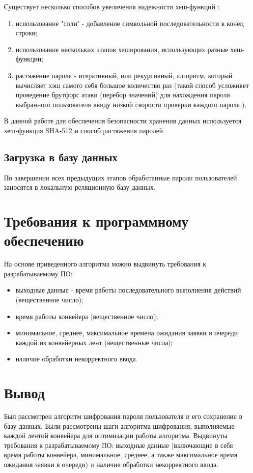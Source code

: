 \documentclass[a4paper,oneside,14pt]{extreport}
\begin{document}
Существует несколько способов увеличения надежности хеш-функций \cite{security}:
\begin{enumerate}
	\item использование "соли" - добавление символьной последовательности в конец строки;
	\item использование нескольких этапов хеширования, использующих разные хеш-функции;
	\item растяжение пароля - итеративный, или рекурсивный, алгоритм, который вычисляет хэш самого себя большое количество раз (такой способ усложняет проведение брутфорс атаки (перебор значений) для нахождения пароля выбранного пользователя ввиду низкой скорости проверки каждого пароля.).
\end{enumerate}

В данной работе для обеспечения безопасности хранения данных используется хеш-функция SHA-512 и способ растяжения паролей.

\subsection{Загрузка в базу данных}
По завершении всех предыдущих этапов обработанные пароли пользователей заносятся в локальную реляционную базу данных.

\section{Требования к программному обеспечению}
На основе приведенного алгоритма можно выдвинуть требования к разрабатываемому ПО:
\begin{itemize}
   	\item выходные данные - время работы последовательного выполнения действий (вещественное число);
	\item время работы конвейера (вещественное число);
	\item минимальное, среднее, максимальное времена ожидания заявки в очереди каждой из конвейерных лент (вещественные числа);
	\item наличие обработки некорректного ввода.
\end{itemize}

\section{Вывод}
 Был рассмотрен алгоритм шифрования пароля пользователя и его сохранение в базу данных.
Были рассмотрены шаги алгоритма шифрования, выполняемые каждой лентой конвейера для оптимизации работы алгоритма.
Выдвинуты требования к разрабатываемому ПО: выходные данные (включающие в себя время работы конвейера, минимальное, среднее, а также максимальное время ожидания заявки в очереди) и наличие обработки некорректного ввода.
\end{document}
